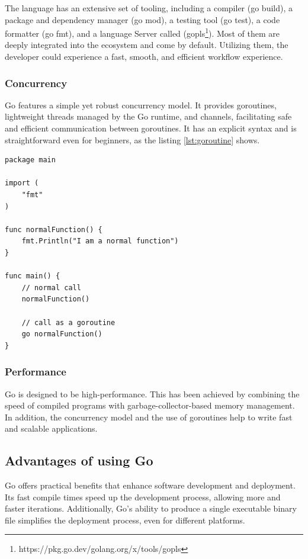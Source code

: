 The language has an extensive set of tooling, including a compiler (go build), a package and dependency manager (go mod), a testing tool (go test), a code formatter (go fmt), and a language Server called (gopls\footnote{https://pkg.go.dev/golang.org/x/tools/gopls}). Most of them are deeply integrated into the ecosystem and come by default. Utilizing them, the developer could experience a fast, smooth, and efficient workflow experience.

\subsubsection{Concurrency}
Go features a simple yet robust concurrency model. It provides goroutines, lightweight threads managed by the Go runtime, and channels, facilitating safe and efficient communication between goroutines. It has an explicit syntax and is straightforward even for beginners, as the listing \ref{lst:goroutine} shows.

\begin{lstlisting}[caption=Calling a normal function as a goroutine,label=lst:goroutine, float]
package main

import (
	"fmt"
)

func normalFunction() {
	fmt.Println("I am a normal function")
}

func main() {
	// normal call
	normalFunction()

	// call as a goroutine
	go normalFunction()
}

\end{lstlisting}

\subsubsection{Performance}

Go is designed to be high-performance. This has been achieved by combining the speed of compiled programs with garbage-collector-based memory management. In addition, the concurrency model and the use of goroutines help to write fast and scalable applications.

\subsection{Advantages of using Go}

Go offers practical benefits that enhance software development and deployment. Its fast compile times speed up the development process, allowing more and faster iterations. Additionally, Go's ability to produce a single executable binary file simplifies the deployment process, even for different platforms.

